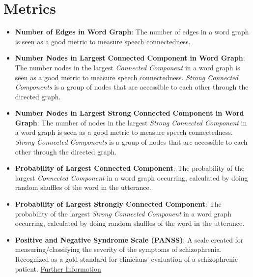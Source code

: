 \documentclass{Paper_Summary}
\begin{document}
\section{Metrics}
    \begin{itemize}
        \item \textbf{Number of Edges in Word Graph}: The number of edges in a word graph is seen as a good metric to measure speech connectedness.
        \item \textbf{Number Nodes in Largest Connected Component in Word Graph}: The number nodes in the largest \emph{Connected Component} in a word graph is seen as a good metric to measure speech connectedness. \emph{Strong Connected Components} is a group of nodes that are accessible to each other through the directed graph.
        \item \textbf{Number Nodes in Largest Strong Connected Component in Word Graph}: The number of nodes in the largest \emph{Strong Connected Component} in a word graph is seen as a good metric to measure speech connectedness. \emph{Strong Connected Components} is a group of nodes that are accessible to each other through the directed graph.
        \item \textbf{Probability of Largest Connected Component}: The probability of the largest \emph{Connected Component} in a word graph occurring, calculated by doing random shuffles of the word in the utterance.
        \item \textbf{Probability of Largest Strongly Connected Component}: The probability of the largest \emph{Strong Connected Component} in a word graph occurring, calculated by doing random shuffles of the word in the utterance.
        \item \textbf{Positive and Negative Syndrome Scale (PANSS)}: A scale created for measuring/classifying the severity of the symptoms of schizophrenia. Recognized as a gold standard for clinicians' evaluation of a schizophrenic patient. \href{https://en.wikipedia.org/wiki/Positive_and_Negative_Syndrome_Scale}{Further Information}

    \end{itemize}
\end{document}
